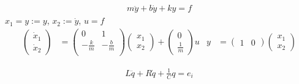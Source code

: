 \documentclass[uplatex,diffipdfmx,a4paper,11pt]{jlreq}
\begin{document}
\begin{example}[]

\end{example}
\begin{example}[バネ・マス・ダンパ系]
  \begin{align}
    m\ddot y + b\dot y + ky = f
  \end{align}
  $x_1 = y := y$, $x_2 := \dot y$, $u = f$
  \begin{align}
    \begin{pmatrix}
      \dot x_1 \\
      \dot x_2
    \end{pmatrix}
                    & = \begin{pmatrix}
                          0            & 1            \\
                          -\frac{k}{m} & -\frac{b}{m} \\
                        \end{pmatrix}
    \begin{pmatrix}
      x_1 \\
      x_2
    \end{pmatrix} +
    \begin{pmatrix}
      0 \\
      \frac{1}{m}
    \end{pmatrix}u &
    y               & = \begin{pmatrix}
                          1 & 0
                        \end{pmatrix}
    \begin{pmatrix}
      x_1 \\
      x_2
    \end{pmatrix}
  \end{align}
\end{example}
\begin{example}[RLC]
  \begin{align}
    L\ddot q + R\dot q + \frac{1}{C}q = e_i
  \end{align}
\end{example}
\end{document}
